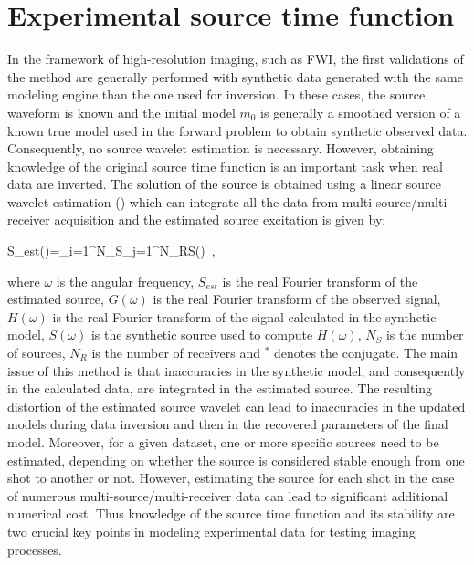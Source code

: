 \documentclass[extra,mreferee]{gji}
\begin{document}

\section{Experimental source time function}

In the framework of high-resolution imaging, such as FWI, the first validations of the method are generally performed with synthetic data generated with the same modeling engine than the one used for inversion. In these cases, the source waveform is known and the initial model $m_{0}$ is generally a smoothed version of a known true model used in the forward problem to obtain synthetic observed data. Consequently, no source wavelet estimation is necessary. However, obtaining knowledge of the original source time function is an important task when real data are inverted. The solution of the source is obtained using a linear source wavelet estimation (\cite{pratt1999fwi,virieux2009fwi}) which can integrate all the data from multi-source/multi-receiver acquisition and the estimated source excitation is given by:

\equation
S_{est}(\omega)=\sum\limits_{i=1}^{N_{S}}\sum\limits_{j=1}^{N_{R}}S(\omega)\ ,
\label{eq:lswe}
\endequation

where $\omega$ is the angular frequency, $S_{est}$ is the real Fourier transform of the estimated source, $G(\omega)$ is the real Fourier transform of the observed signal, $H(\omega)$ is the real Fourier transform of the signal calculated in the synthetic model, $S(\omega)$ is the synthetic source used to compute $H(\omega)$, $N_{S}$ is the number of sources, $N_{R}$ is the number of receivers and $^{*}$ denotes the conjugate. The main issue of this method is that inaccuracies in the synthetic model, and consequently in the calculated data, are integrated in the estimated source. The resulting distortion of the estimated source wavelet can lead to inaccuracies in the updated models during data inversion and then in the recovered parameters of the final model. Moreover, for a given dataset, one or more specific sources need to be estimated, depending on whether the source is considered stable enough from one shot to another or not. However, estimating the source for each shot in the case of numerous multi-source/multi-receiver data can lead to significant additional numerical cost. Thus knowledge of the source time function and its stability are two crucial key points in modeling experimental data for testing imaging processes.
\end{document}
